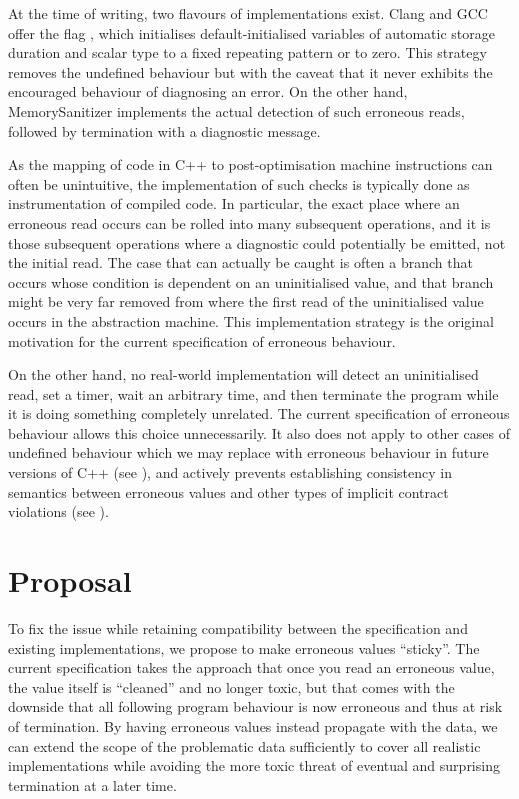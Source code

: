 At the time of writing, two flavours of \cite{P2795R5} implementations exist. Clang and GCC offer the flag \mbox{}, which initialises default-initialised variables of automatic storage duration and scalar type to a fixed repeating pattern or to zero. This strategy removes the undefined behaviour but with the caveat that it never exhibits the encouraged behaviour of diagnosing an error. On the other hand, MemorySanitizer implements the actual detection of such erroneous reads, followed by termination with a diagnostic message.

As the mapping of code in C++ to  post-optimisation machine instructions can often be unintuitive, the implementation  of such checks is typically done as instrumentation of compiled code.  In particular, the exact place where an erroneous read occurs can be rolled into many subsequent operations, and it is those subsequent operations where a diagnostic could potentially be emitted, not the initial read.  The case that can actually be caught is often a branch that occurs whose condition is dependent on an uninitialised value, and that branch might be very far removed from where the first read of the uninitialised value occurs in the abstraction machine. This implementation strategy is the original motivation for the current specification of erroneous behaviour.

On the other hand, no real-world implementation will detect an uninitialised read, set a timer, wait an arbitrary time, and then terminate the program while it is doing something completely unrelated.  The current specification of erroneous behaviour allows this choice unnecessarily. It also does not apply to other cases of undefined behaviour which we may replace with erroneous behaviour in future versions of C++ (see \cite{P3100R4}), and actively prevents establishing consistency in semantics between erroneous values and other types of implicit contract violations (see \cite{P3229R0}).

\section{Proposal}

To fix the issue while retaining compatibility between the specification and existing implementations, we propose to make erroneous values ``sticky''.  The current specification takes the approach that once you read an erroneous value, the value itself is ``cleaned'' and no longer toxic, but that comes with the downside that all following program behaviour is now erroneous and thus at risk of termination. By having erroneous values instead propagate with the data, we can extend the scope of the problematic data sufficiently to cover all realistic implementations while avoiding the more toxic threat of eventual and surprising termination at a later time.

